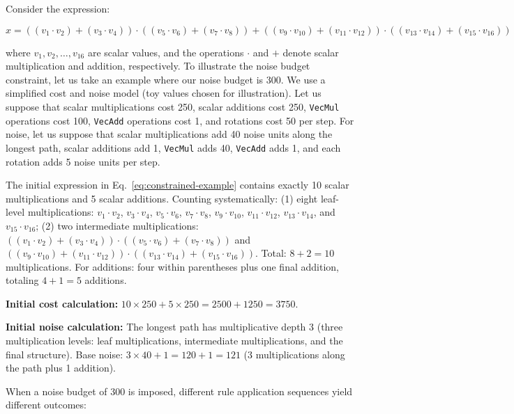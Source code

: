Consider the expression:

{
\shrink[1.5]
\CodeSize
\begin{equation}
x = ( (v_1 \cdot v_2) + (v_3 \cdot v_4) ) \cdot ( (v_5 \cdot v_6) + (v_7 \cdot v_8) ) + ( (v_9 \cdot v_{10}) + (v_{11} \cdot v_{12}) ) \cdot ( (v_{13} \cdot v_{14}) + (v_{15} \cdot v_{16}) )
\label{eq:constrained-example}
\tag{3}
\end{equation}
\shrink[1.5]
}

where $v_1, v_2, \ldots, v_{16}$ are scalar values, and the operations $\cdot$ and $+$ denote scalar multiplication and addition, respectively. To illustrate the noise budget constraint, let us take an example where our noise budget is 300. We use a simplified cost and noise model (toy values chosen for illustration). Let us suppose that scalar multiplications cost 250, scalar additions cost 250, \texttt{VecMul} operations cost 100, \texttt{VecAdd} operations cost 1, and rotations cost 50 per step. For noise, let us suppose that scalar multiplications add 40 noise units along the longest path, scalar additions add 1, \texttt{VecMul} adds 40, \texttt{VecAdd} adds 1, and each rotation adds 5 noise units per step.

The initial expression in Eq.~\ref{eq:constrained-example} contains exactly 10 scalar multiplications and 5 scalar additions. Counting systematically: (1) eight leaf-level multiplications: $v_1 \cdot v_2$, $v_3 \cdot v_4$, $v_5 \cdot v_6$, $v_7 \cdot v_8$, $v_9 \cdot v_{10}$, $v_{11} \cdot v_{12}$, $v_{13} \cdot v_{14}$, and $v_{15} \cdot v_{16}$; (2) two intermediate multiplications: $( (v_1 \cdot v_2) + (v_3 \cdot v_4) ) \cdot ( (v_5 \cdot v_6) + (v_7 \cdot v_8) )$ and $( (v_9 \cdot v_{10}) + (v_{11} \cdot v_{12}) ) \cdot ( (v_{13} \cdot v_{14}) + (v_{15} \cdot v_{16}) )$. Total: $8 + 2 = 10$ multiplications. For additions: four within parentheses plus one final addition, totaling $4 + 1 = 5$ additions. 

\textbf{Initial cost calculation:} $10 \times 250 + 5 \times 250 = 2500 + 1250 = 3750$.

\textbf{Initial noise calculation:} The longest path has multiplicative depth 3 (three multiplication levels: leaf multiplications, intermediate multiplications, and the final structure). Base noise: $3 \times 40 + 1 = 120 + 1 = 121$ (3 multiplications along the path plus 1 addition).

When a noise budget of 300 is imposed, different rule application sequences yield different outcomes:


